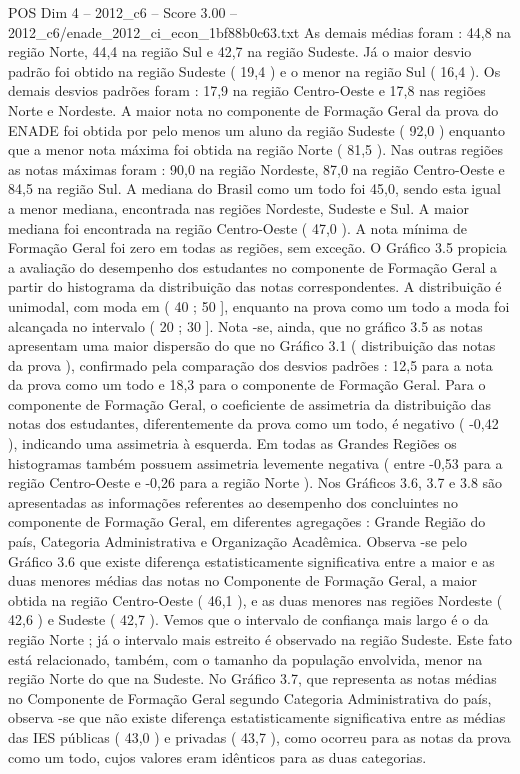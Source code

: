 \begin{textsample}{POS Dim 4 – 2012\_c6 – Score 3.00 – 2012\_c6/enade\_2012\_ci\_econ\_1bf88b0c63.txt}
As demais médias foram : 44,8 na região Norte, 44,4 na região Sul e 42,7 na região Sudeste.
Já o maior desvio padrão foi obtido na região Sudeste ( 19,4 ) e o menor na região Sul ( 16,4 ).
Os demais desvios padrões foram : 17,9 na região Centro-Oeste e 17,8 nas regiões Norte e Nordeste.
A maior nota no componente de Formação Geral da prova do ENADE foi obtida por pelo menos um aluno da região Sudeste ( 92,0 ) enquanto que a menor nota máxima foi obtida na região Norte ( 81,5 ).
Nas outras regiões as notas máximas foram : 90,0 na região Nordeste, 87,0 na região Centro-Oeste e 84,5 na região Sul.
A mediana do Brasil como um todo foi 45,0, sendo esta igual a menor mediana, encontrada nas regiões Nordeste, Sudeste e Sul.
A maior mediana foi encontrada na região Centro-Oeste ( 47,0 ).
A nota mínima de Formação Geral foi zero em todas as regiões, sem exceção.
O Gráfico 3.5 propicia a avaliação do desempenho dos estudantes no componente de Formação Geral a partir do histograma da distribuição das notas correspondentes.
A distribuição é unimodal, com moda em ( 40 ; 50 ], enquanto na prova como um todo a moda foi alcançada no intervalo ( 20 ; 30 ].
Nota -se, ainda, que no gráfico 3.5 as notas apresentam uma maior dispersão do que no Gráfico 3.1 ( distribuição das notas da prova ), confirmado pela comparação dos desvios padrões : 12,5 para a nota da prova como um todo e 18,3 para o componente de Formação Geral.
Para o componente de Formação Geral, o coeficiente de assimetria da distribuição das notas dos estudantes, diferentemente da prova como um todo, é negativo ( -0,42 ), indicando uma assimetria à esquerda.
Em todas as Grandes Regiões os histogramas também possuem assimetria levemente negativa ( entre -0,53 para a região Centro-Oeste e -0,26 para a região Norte ).
Nos Gráficos 3.6, 3.7 e 3.8 são apresentadas as informações referentes ao desempenho dos concluintes no componente de Formação Geral, em diferentes agregações : Grande Região do país, Categoria Administrativa e Organização Acadêmica.
Observa -se pelo Gráfico 3.6 que existe diferença estatisticamente significativa entre a maior e as duas menores médias das notas no Componente de Formação Geral, a maior obtida na região Centro-Oeste ( 46,1 ), e as duas menores nas regiões Nordeste ( 42,6 ) e Sudeste ( 42,7 ).
Vemos que o intervalo de confiança mais largo é o da região Norte ; já o intervalo mais estreito é observado na região Sudeste.
Este fato está relacionado, também, com o tamanho da população envolvida, menor na região Norte do que na Sudeste.
No Gráfico 3.7, que representa as notas médias no Componente de Formação Geral segundo Categoria Administrativa do país, observa -se que não existe diferença estatisticamente significativa entre as médias das IES públicas ( 43,0 ) e privadas ( 43,7 ), como ocorreu para as notas da prova como um todo, cujos valores eram idênticos para as duas categorias.

\end{textsample}
